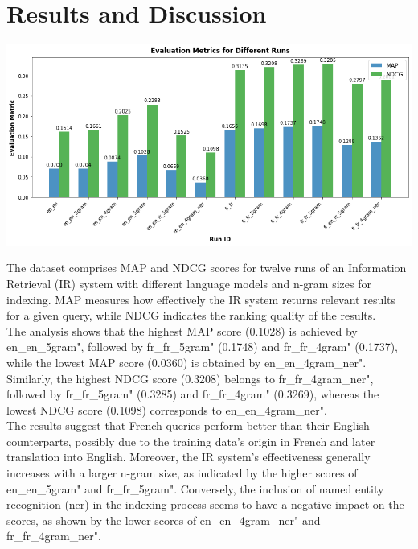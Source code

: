 \section{Results and Discussion}
\label{sec:results}

\includegraphics[width=1\textwidth]{figure/chart.png}

The dataset comprises MAP and NDCG scores for twelve
runs of an Information Retrieval (IR) system with different
language models and n-gram sizes for indexing. MAP measures how
effectively the IR system returns relevant results for a given
query, while NDCG indicates the ranking quality of the results.\\

The analysis shows that the highest MAP score (0.1028) is achieved by en\_en\_5gram", 
followed by fr\_fr\_5gram" (0.1748) and fr\_fr\_4gram" (0.1737), while the lowest MAP score (0.0360) is obtained by en\_en\_4gram\_ner". Similarly,
the highest NDCG score (0.3208) belongs to fr\_fr\_4gram\_ner", followed by fr\_fr\_5gram" (0.3285) and
 fr\_fr\_4gram" (0.3269), whereas the lowest NDCG score (0.1098) corresponds to en\_en\_4gram\_ner".\\

The results suggest that French queries perform better than their
English counterparts, possibly due to the training data's origin in
French and later translation into English. Moreover, the IR system's
effectiveness generally increases with a larger n-gram size, as indicated
by the higher scores of en\_en\_5gram" and fr\_fr\_5gram". Conversely, the
inclusion of named entity recognition (ner) in the indexing process seems
to have a negative impact on the scores, as shown by the lower scores of
en\_en\_4gram\_ner" and fr\_fr\_4gram\_ner".\\






